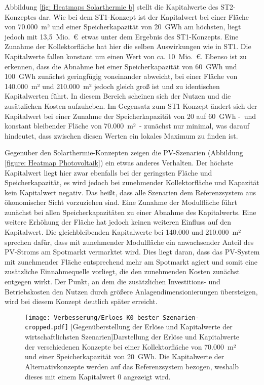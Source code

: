 Abbildung \ref{fig: Heatmaps Solarthermie b} stellt die Kapitalwerte des ST2-Konzeptes dar. Wie bei dem ST1-Konzept ist der Kapitalwert bei einer Fläche von 70.000~m² und einer Speicherkapazität von 20~GWh am höchsten, liegt jedoch mit 13,5~Mio.~\euro\ etwas unter dem Ergebnis des ST1-Konzepts. Eine Zunahme der Kollektorfläche hat hier die selben Auswirkungen wie in ST1. Die Kapitalwerte fallen konstant um einen Wert von ca. 10~Mio.~\euro. Ebenso ist zu erkennen, dass die Abnahme bei einer Speicherkapazität von 60~GWh und 100~GWh zunächst geringfügig voneinander abweicht, bei einer Fläche von 140.000~m² und 210.000~m² jedoch gleich groß ist und zu identischen Kapitalwerten führt. In diesem Bereich scheinen sich der Nutzen und die zusätzlichen Kosten aufzuheben. Im Gegensatz zum ST1-Konzept ändert sich der Kapitalwert bei einer Zunahme der Speicherkapazität von 20 auf 60~GWh -~und konstant bleibender Fläche von 70.000~m²~- zunächst nur minimal, was darauf hindeutet, dass zwischen diesen Werten ein lokales Maximum zu finden ist.

Gegenüber den Solarthermie-Konzepten zeigen die \ac{PV}-Szenarien (Abbildung \ref{figure: Heatmap Photovoltaik}) ein etwas anderes Verhalten. Der höchste Kapitalwert liegt hier zwar ebenfalls bei der geringsten Fläche und Speicherkapazität, es wird jedoch bei zunehmender Kollektorfläche und Kapazität kein Kapitalwert negativ. Das heißt, dass alle Szenarien dem Referenzsystem aus ökonomischer Sicht vorzuziehen sind. Eine Zunahme der Modulfläche führt zunächst bei allen Speicherkapazitäten zu einer Abnahme des Kapitalwerts. Eine weitere Erhöhung der Fläche hat jedoch keinen weiteren Einfluss auf den Kapitalwert. Die gleichbleibenden Kapitalwerte bei 140.000 und 210.000~m² sprechen dafür, dass mit zunehmender Modulfläche ein anwachsender Anteil des \ac{PV}-Stroms am Spotmarkt vermarktet wird. Dies liegt daran, dass das \ac{PV}-System mit zunehmender Fläche entsprechend mehr am Spotmarkt agiert und somit eine zusätzliche Einnahmequelle vorliegt, die den zunehmenden Kosten zunächst entgegen wirkt. Der Punkt, an dem die zusätzlichen Investitions- und Betriebskosten den Nutzen durch größere Anlagendimensionierungen übersteigen, wird bei diesem Konzept deutlich später erreicht. 

	\begin{figure}[ht]
		\centering
		\texttt{[image: Verbesserung/Erloes\_K0\_bester\_Szenarien-cropped.pdf]}
		[Gegenüberstellung der Erlöse und Kapitalwerte der wirtschaftlichsten Szenarien]{Darstellung der Erlöse und Kapitalwerte der verschiedenen Konzepte bei einer Kollektorfläche von 70.000~m² und einer Speicherkapazität von 20~GWh. Die Kapitalwerte der Alternativkonzepte werden auf das Referenzsystem bezogen, weshalb dieses mit einem Kapitalwert 0 angezeigt wird.}
		\label{figure: Erloes_K0_bester_Szenarien}
	\end{figure}

